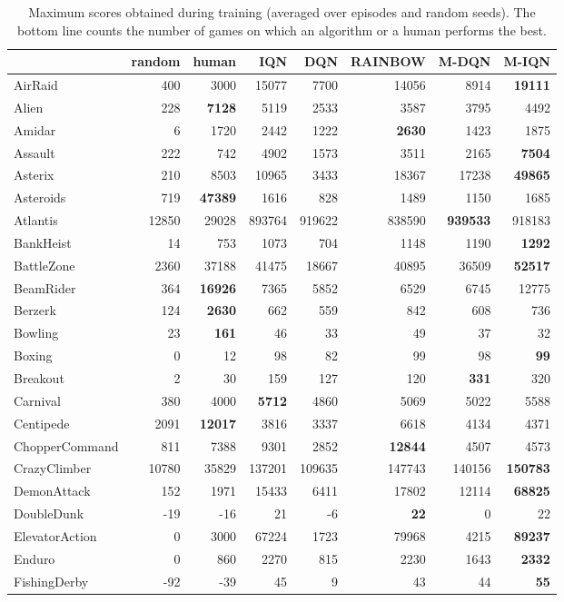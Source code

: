 \documentclass{article}
\begin{document}
\begin{table}
    \caption{Maximum scores obtained during training (averaged over  episodes and   random seeds). The bottom line counts the number of games on which an algorithm or a human performs the best.} 
    \centering
\tiny
    \begin{tabular}{l r r r r r r r}
\toprule
&random&human&IQN&DQN&RAINBOW&M-DQN&M-IQN\\ 
\midrule
AirRaid&400&3000&15077&7700&14056&8914&\textbf{19111}\\
Alien&228&\textbf{7128}&5119&2533&3587&3795&4492\\
Amidar&6&1720&2442&1222&\textbf{2630}&1423&1875\\
Assault&222&742&4902&1573&3511&2165&\textbf{7504}\\
Asterix&210&8503&10965&3433&18367&17238&\textbf{49865}\\
Asteroids&719&\textbf{47389}&1616&828&1489&1150&1685\\
Atlantis&12850&29028&893764&919622&838590&\textbf{939533}&918183\\
BankHeist&14&753&1073&704&1148&1190&\textbf{1292}\\
BattleZone&2360&37188&41475&18667&40895&36509&\textbf{52517}\\
BeamRider&364&\textbf{16926}&7365&5852&6529&6745&12775\\
Berzerk&124&\textbf{2630}&662&559&842&608&736\\
Bowling&23&\textbf{161}&46&33&49&37&32\\
Boxing&0&12&98&82&99&98&\textbf{99}\\
Breakout&2&30&159&127&120&\textbf{331}&320\\
Carnival&380&4000&\textbf{5712}&4860&5069&5022&5588\\
Centipede&2091&\textbf{12017}&3816&3337&6618&4134&4371\\
ChopperCommand&811&7388&9301&2852&\textbf{12844}&4507&4573\\
CrazyClimber&10780&35829&137201&109635&147743&140156&\textbf{150783}\\
DemonAttack&152&1971&15433&6411&17802&12114&\textbf{68825}\\
DoubleDunk&-19&-16&21&-6&\textbf{22}&0&22\\
ElevatorAction&0&3000&67224&1723&79968&4215&\textbf{89237}\\
Enduro&0&860&2270&815&2230&1643&\textbf{2332}\\
FishingDerby&-92&-39&45&9&43&44&\textbf{55}\\

\end{tabular}
\end{table}
\end{document}
